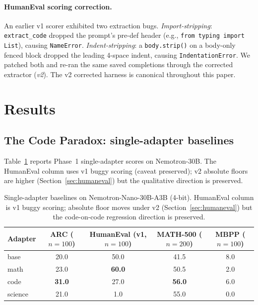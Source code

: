 \documentclass{article}
\begin{document}
\paragraph{HumanEval scoring correction.} An earlier v1 scorer exhibited two extraction bugs. \emph{Import-stripping}: \texttt{extract\_code} dropped the prompt's pre-def header (e.g., \texttt{from typing import List}), causing \texttt{NameError}. \emph{Indent-stripping}: a \texttt{body.strip()} on a body-only fenced block dropped the leading 4-space indent, causing \texttt{IndentationError}. We patched both and re-ran the same saved completions through the corrected extractor (\emph{v2}). The v2 corrected harness is canonical throughout this paper.

\section{Results}

\subsection{The Code Paradox: single-adapter baselines}
\label{sec:phase1}

Table~\ref{tab:phase1} reports Phase~1 single-adapter scores on Nemotron-30B. The HumanEval column uses v1 buggy scoring (caveat preserved); v2 absolute floors are higher (Section~\ref{sec:humaneval}) but the qualitative direction is preserved.

\begin{table}[h]
  \caption{Single-adapter baselines on Nemotron-Nano-30B-A3B (4-bit). HumanEval column is v1 buggy scoring; absolute floor moves under v2 (Section~\ref{sec:humaneval}) but the code-on-code regression direction is preserved.}
  \label{tab:phase1}
  \centering
  \small
  \begin{tabular}{lcccc}
    \toprule
    Adapter & ARC ($n{=}100$) & HumanEval (v1, $n{=}100$) & MATH-500 ($n{=}200$) & MBPP ($n{=}100$) \\
    \midrule
    base    & 20.0 & 50.0 & 41.5 & 8.0 \\
    math    & 23.0 & \textbf{60.0} & 50.5 & 2.0 \\
    code    & \textbf{31.0} & 27.0 & \textbf{56.0} & 6.0 \\
    science & 21.0 &  1.0 & 55.0 & 0.0 \\
    \bottomrule
  \end{tabular}
\end{table}
\end{document}
